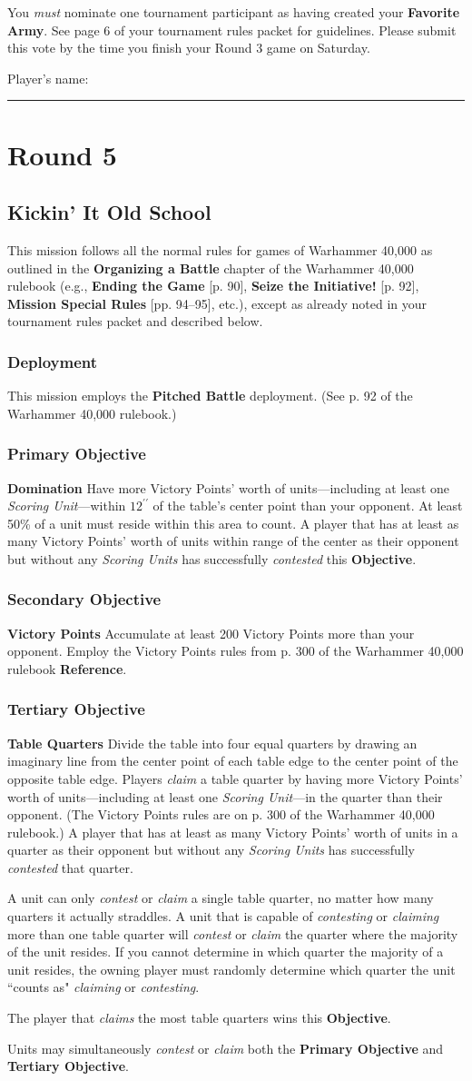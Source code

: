 \documentclass[12pt,titlepage]{article}
\newcommand{\paragraphsmall}[1]{\noindent\textbf{#1}\quad}
\newcommand{\gameboilerplate}{This mission follows all the normal rules for games of Warhammer 40,000 as outlined in the \textbf{Organizing a Battle} chapter of the Warhammer 40,000 rulebook (e.g., \textbf{Ending the Game} [p. 90], \textbf{Seize the Initiative!} [p. 92], \textbf{Mission Special Rules} [pp. 94--95], etc.), except as already noted in your tournament rules packet and described below.}
\newcommand{\pitchedbattle}{This mission employs the \textbf{Pitched Battle} deployment. (See p. 92 of the Warhammer 40,000 rulebook.)}
\newcommand{\tablequarters}{\paragraphsmall{Table Quarters} Divide the table into four equal quarters by drawing an imaginary line from the center point of each table edge to the center point of the opposite table edge. Players \textit{claim} a table quarter by having more Victory Points' worth of units---including at least one \textit{Scoring Unit}---in the quarter than their opponent. (The Victory Points rules are on p. 300 of the Warhammer 40,000 rulebook.) A player that has at least as many Victory Points' worth of units in a quarter as their opponent but without any \textit{Scoring Units} has successfully \textit{contested} that quarter.

A unit can only \textit{contest} or \textit{claim} a single table quarter, no matter how many quarters it actually straddles. A unit that is capable of \textit{contesting} or \textit{claiming} more than one table quarter will \textit{contest} or \textit{claim} the quarter where the majority of the unit resides. If you cannot determine in which quarter the majority of a unit resides, the owning player must randomly determine which quarter the unit ``counts as" \textit{claiming} or \textit{contesting}.

The player that \textit{claims} the most table quarters wins this \textbf{Objective}.}
\newcommand{\victorypoints}{\paragraphsmall{Victory Points} Accumulate at least 200 Victory Points more than your opponent. Employ the Victory Points rules from p. 300 of the Warhammer 40,000 rulebook \textbf{Reference}.}
\begin{document}
You \textit{must} nominate one tournament participant as having created your \textbf{Favorite Army}. See page 6 of your tournament rules packet for guidelines. Please submit this vote by the time you finish your Round 3 game on Saturday.

\vspace{12pt}
\noindent Player's name: \rule{5.25in}{.5pt}

\newpage
\section*{Round 5}
\subsection*{Kickin' It Old School}
{\footnotesize
\gameboilerplate

\vspace{-6pt}
\subsubsection*{Deployment}

\pitchedbattle

\vspace{-6pt}
\subsubsection*{Primary Objective}

\paragraphsmall{Domination} Have more Victory Points' worth of units---including at least one \textit{Scoring Unit}---within $12^{\prime\prime}$ of the table's center point than your opponent. At least 50\% of a unit must reside within this area to count. A player that has at least as many Victory Points' worth of units within range of the center as their opponent but without any \textit{Scoring Units} has successfully \textit{contested} this \textbf{Objective}.

\vspace{-6pt}
\subsubsection*{Secondary Objective}

\victorypoints

\vspace{-6pt}
\subsubsection*{Tertiary Objective}

\tablequarters

Units may simultaneously \textit{contest} or \textit{claim} both the \textbf{Primary Objective} and \textbf{Tertiary Objective}. 

}
\end{document}
